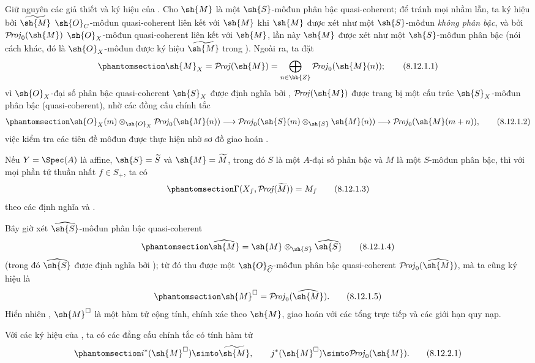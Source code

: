 \documentclass[oneside,10pt]{amsart}
\makeatletter
\newcommand{\ega@arrow}[2]{\mathchoice{#1}{#2}{#2}{#2}}
\renewcommand{\to}{\ega@arrow{\longrightarrow}{\rightarrow}}
\def\shProj{\mathcal{P}\!\mathit{roj}}
\newcommand{\oldpage}[2][]{\marginnote{\normalfont\footnotesize\textbf{#1}~|~#2}\ignorespaces}
\let\EGAOriginalLabel\label
\renewcommand{\label}[1]{\phantomsection\EGAOriginalLabel{#1}}
\makeatother
\begin{document}
\begin{env}[8.12.1]
\label{II.8.12.1}
Giữ nguyên các giả thiết và ký hiệu của .
Cho $\sh{M}$ là một $\sh{S}$-môđun phân bậc quasi-coherent;
để tránh mọi nhầm lẫn, ta ký hiệu bởi $\widetilde{\sh{M}}$ $\sh{O}_C$-môđun
\oldpage[II]{192}
quasi-coherent liên kết với $\sh{M}$  khi $\sh{M}$ được xét như một $\sh{S}$-môđun \emph{không phân bậc}, và bởi $\shProj_0(\sh{M})$ $\sh{O}_X$-môđun quasi-coherent liên kết với $\sh{M}$, lần này $\sh{M}$ được xét như một $\sh{S}$-môđun phân bậc (nói cách khác, đó là $\sh{O}_X$-môđun được ký hiệu $\widetilde{\sh{M}}$ trong ).
Ngoài ra, ta đặt
\[
\label{II.8.12.1.1}
  \sh{M}_X=\shProj(\sh{M})
  =\bigoplus_{n\in\bb{Z}}\shProj_0(\sh{M}(n));
\tag{8.12.1.1}
\]
vì $\sh{O}_X$-đại số phân bậc quasi-coherent $\sh{S}_X$ được định nghĩa bởi , $\shProj(\sh{M})$ được trang bị một cấu trúc $\sh{S}_X$-môđun phân bậc (quasi-coherent), nhờ các đồng cấu chính tắc 
\[
\label{II.8.12.1.2}
  \sh{O}_X(m)\otimes_{\sh{O}_X}
  \shProj_0(\sh{M}(n))
  \to \shProj_0(\sh{S}(m)\otimes_{\sh{S}}\sh{M}(n))
  \to \shProj_0(\sh{M}(m+n)),
\tag{8.12.1.2}
\]
việc kiểm tra các tiên đề môđun được thực hiện nhờ sơ đồ giao hoán .

Nếu $Y=\Spec(A)$ là affine, $\sh{S}=\widetilde{S}$ và $\sh{M}=\widetilde{M}$, trong đó $S$ là một $A$-đại số phân bậc và $M$ là một $S$-môđun phân bậc, thì với mọi phần tử thuần nhất $f\in S_+$, ta có
\[
\label{II.8.12.1.3}
  \Gamma(X_f,\shProj(\widetilde{M}))=M_f
\tag{8.12.1.3}
\]
theo các định nghĩa và .

Bây giờ xét $\widehat{\sh{S}}$-môđun phân bậc quasi-coherent
\[
\label{II.8.12.1.4}
  \widehat{\sh{M}}
  =\sh{M}\otimes_{\sh{S}}\widehat{\sh{S}}
\tag{8.12.1.4}
\]
(trong đó $\widehat{\sh{S}}$ được định nghĩa bởi );
từ đó thu được một $\sh{O}_{\widehat{C}}$-môđun phân bậc quasi-coherent $\shProj_0(\widehat{\sh{M}})$, mà ta cũng ký hiệu là
\[
\label{II.8.12.1.5}
  \sh{M}^{\square}=\shProj_0(\widehat{\sh{M}}).
\tag{8.12.1.5}
\]
Hiển nhiên , $\sh{M}^{\square}$ là một hàm tử cộng tính, chính xác theo $\sh{M}$, giao hoán với các tổng trực tiếp và các giới hạn quy nạp.
\end{env}

\begin{proposition}[8.12.2]
\label{II.8.12.2}
Với các ký hiệu của , ta có các đẳng cấu chính tắc có tính hàm tử
\[
\label{II.8.12.2.1}
  i^*(\sh{M}^{\square})\simto\widetilde{\sh{M}},
  \qquad
  j^*(\sh{M}^{\square})\simto\shProj_0(\sh{M}).
\tag{8.12.2.1}
\]
\end{proposition}
\end{document}
